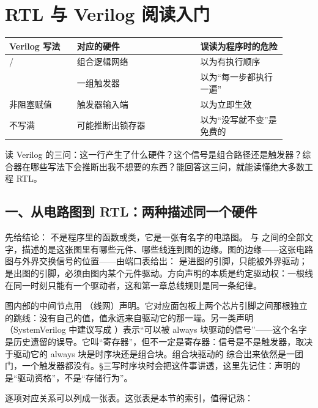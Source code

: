 \chapter{RTL 与 Verilog 阅读入门}

\begin{longtable}{L{0.22\linewidth}L{0.4\linewidth}L{0.28\linewidth}}
\toprule
Verilog 写法 & 对应的硬件 & 误读为程序时的危险 \\
\midrule
{} /  & 组合逻辑网络 & 以为有执行顺序 \\
 & 一组触发器 & 以为“每一步都执行一遍” \\
非阻塞赋值 \code{<=} & 触发器输入端 & 以为立即生效 \\
 不写满 & 可能推断出锁存器 & 以为“没写就不变”是免费的 \\
\bottomrule
\end{longtable}

\begin{keyidea}
读 Verilog 的三问：这一行产生了什么硬件？这个信号是组合路径还是触发器？综合器在哪些写法下会推断出我不想要的东西？能回答这三问，就能读懂绝大多数工程 RTL。
\end{keyidea}

\section{一、从电路图到 RTL：两种描述同一个硬件}

先给结论： 不是程序里的函数或类，它是一张有名字的电路图。 与  之间的全部文字，描述的是这张图里有哪些元件、哪些线连到图的边缘。图的边缘——这张电路图与外界交换信号的位置——由端口表给出： 是进图的引脚，只能被外界驱动； 是出图的引脚，必须由图内某个元件驱动。方向声明的本质是约定驱动权：一根线在同一时刻只能有一个驱动者，这和第一章总线规则是同一条纪律。

图内部的中间节点用 （线网）声明。它对应面包板上两个芯片引脚之间那根独立的跳线：没有自己的值，值永远来自驱动它的那一端。另一类声明 （SystemVerilog 中建议写成 ）表示“可以被 always 块驱动的信号”——这个名字是历史遗留的误导。它叫“寄存器”，但不一定是寄存器：信号是不是触发器，取决于驱动它的 always 块是时序块还是组合块。组合块驱动的  综合出来依然是一团门，一个触发器都没有。§三写时序块时会把这件事讲透，这里先记住：声明的是“驱动资格”，不是“存储行为”。

逐项对应关系可以列成一张表。这张表是本节的索引，值得记熟：

